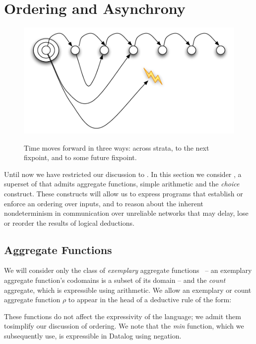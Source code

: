 \section{Ordering and Asynchrony}

\begin{figure}[t]
  \centering
  \includegraphics[width=0.75\linewidth]{figures/dedalus-time.pdf}
  \label{fig:dedalus-time}
  \caption{Time moves forward in three ways: across strata, to the next fixpoint, and to some future fixpoint.}
\vspace{-8pt}
\end{figure}

Until now we have restricted our discussion to \slang.  In this section we
consider \lang, a superset of \slang that admits aggregate functions, simple
arithmetic and the \emph{choice} construct.  These constructs will allow us to
express programs that establish or enforce an ordering over inputs, and to
reason about the inherent nondeterminism in communication over unreliable
networks that may delay, lose or reorder the results of logical deductions.

\subsection{Aggregate Functions}

We will consider only the class of \emph{exemplary} aggregate
functions~\cite{tag} -- an exemplary aggregate function's codomains is a subset
of its domain -- and the \emph{count} aggregate, which is expressible using
arithmetic.  We allow an exemplary or count aggregate function $\rho$ to appear
in the head of a deductive rule of the form:

\linebreak{}

These functions do not affect the expressivity of the language; we admit them
tosimplify our discussion of ordering.  We note that the \emph{min} function,
which we subsequently use, is expressible in Datalog using negation.

